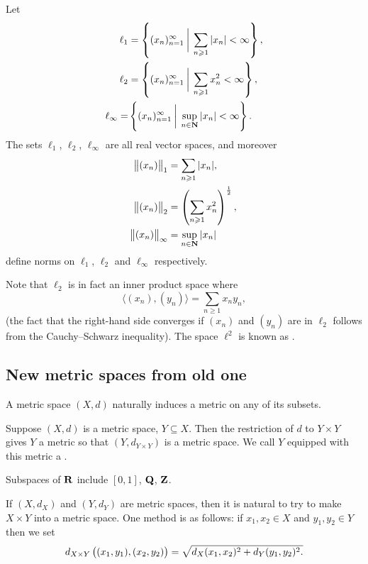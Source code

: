 \begin{example}
Let
\begin{align*}
\ell_1&=\left\{(x_n)_{n=1}^\infty\:\bigg|\:\sum_{n\geqslant1}|x_n|<\infty\right\},\\
\ell_2&=\left\{(x_n)_{n=1}^\infty\:\bigg|\:\sum_{n\geqslant1}x_n^2<\infty\right\},\\
\ell_\infty=&\left\{(x_n)_{n=1}^\infty\:\bigg|\:\sup_{n\in\mathbf N}|x_n|<\infty\right\}.
\end{align*}
The sets $\ell_1$, $\ell_2$, $\ell_\infty$ are all real vector spaces, and moreover
\begin{align*}
\norm{(x_n)}_1&=\sum_{n\geqslant1}|x_n|,\\
\norm{(x_n)}_2&=\left(\sum_{n\geqslant1}x_n^2\right)^\frac{1}{2},\\
\norm{(x_n)}_\infty&=\sup_{n\in\mathbf N}|x_n|
\end{align*}
define norms on $\ell_1$, $\ell_2$ and $\ell_\infty$ respectively.

Note that $\ell_2$ is in fact an inner product space where
\[\langle(x_n),(y_n)\rangle=\sum_{n\ge1}x_ny_n,\]
(the fact that the right-hand side converges if $(x_n)$ and $(y_n)$ are in $\ell_2$ follows from the Cauchy--Schwarz inequality). The space $\ell^2$ is known as .
\end{example}

\subsection{New metric spaces from old one}
A metric space $(X,d)$ naturally induces a metric on any of its subsets.

\begin{definition}[Subspace]
Suppose $(X,d)$ is a metric space, $Y\subseteq X$. Then the restriction of $d$ to $Y\times Y$ gives $Y$ a metric so that $(Y,d_{Y\times Y})$ is a metric space. We call $Y$ equipped with this metric a .
\end{definition}

\begin{example}
Subspaces of $\mathbf R$ include $[0,1]$, $\mathbf Q$, $\mathbf Z$.
\end{example}

\begin{definition}
If $(X,d_X)$ and $(Y,d_Y)$ are metric spaces, then it is natural to try to make $X\times Y$ into a metric space. One method is as follows: if $x_1,x_2\in X$ and $y_1,y_2\in Y$ then we set
\[d_{X\times Y}\left((x_1,y_1),(x_2,y_2)\right)=\sqrt{d_X(x_1,x_2)^2+d_Y(y_1,y_2)^2.}\]
\end{definition}

